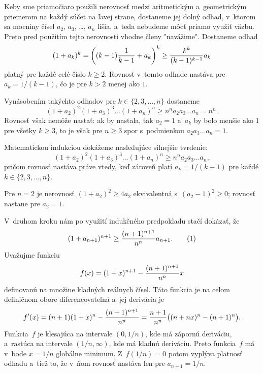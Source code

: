 {%
Keby sme priamočiaro použili nerovnosť medzi aritmetickým a~geometrickým priemerom na každý súčet na ľavej strane, dostaneme jej dolný odhad, v~ktorom sa mocniny čísel $a_2$, $a_3$, \dots, $a_n$ líšia, a~teda nebudeme môcť priamo využiť väzbu. Preto pred použitím tejto nerovnosti vhodne členy "navážime". Dostaneme odhad
$$
(1+a_k)^k = \left((k-1){1\over k-1}+a_k\right)^k\ge {k^k\over (k-1)^{k-1}} a_k
$$
platný pre každé celé číslo $k\ge 2$. Rovnosť v~tomto odhade nastáva pre $a_k = 1/(k-1)$, čo je pre $k>2$ menej ako $1$.

Vynásobením takýchto odhadov pre $k\in\{2,3,\dots,n\}$ dostaneme
$$
(1+a_2)^2(1+a_3)^3\dots(1+a_n)^n\ge n^na_2a_3\dots a_n = n^n.
$$
Rovnosť však nemôže nastať: ak by nastala, tak $a_2=1$ a~$a_k$ by bolo menšie ako $1$ pre všetky $k\ge 3$, to je však pre $n\ge 3$ spor s~podmienkou $a_2a_3\dots a_n=1$.

\ineriesenie
Matematickou indukciou dokážeme nasledujúce silnejšie tvrdenie:
$$
(1+a_2)^2(1+a_3)^3\dots(1+a_n)^n\ge n^n a_2a_3\dots a_n,
$$
pričom rovnosť nastáva práve vtedy, keď zároveň platí $a_k = 1/(k-1)$ pre každé $k\in \{2,3,\dots, n\}$.

Pre $n=2$ je nerovnosť $(1+a_2)^2\ge 4a_2$ ekvivalentná s~$(a_2-1)^2\ge 0$; rovnosť nastane pre $a_2=1$.

V~druhom kroku nám po využití indukčného predpokladu stačí dokázať, že
$$
(1+a_{n+1})^{n+1}\ge {(n+1)^{n+1}\over n^n} a_{n+1}.
\tag1%
$$
Uvažujme funkciu
$$
f(x) = (1+x)^{n+1}-{(n+1)^{n+1}\over n^n}x
$$
definovanú na množine kladných reálnych čísel. Táto funkcia je na celom definičnom obore diferencovateľná a~jej derivácia je
$$
f'(x) = (n+1)(1+x)^n-{(n+1)^{n+1}\over n^n} = {n+1\over n^n}\big((n+nx)^n-(n+1)^n\big).
$$
Funkcia~$f$ je klesajúca na intervale $(0, 1/n)$, kde má zápornú deriváciu, a~rastúca na intervale $(1/n,\infty)$, kde má kladnú deriváciu.
Preto funkcia~$f$ má v~bode $x=1/n$ globálne minimum. Z~$f(1/n)=0$ potom vyplýva platnosť odhadu  a~tiež to, že v~ňom rovnosť nastáva len pre $a_{n+1}=1/n$.
}

